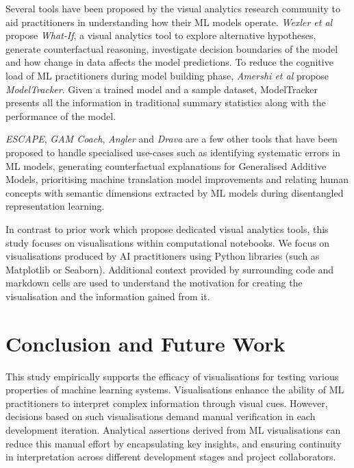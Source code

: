 Several tools have been proposed by the visual analytics research community to aid practitioners in understanding how their ML models operate. \emph{Wexler et al} propose \textit{What-If}, a visual analytics tool to explore alternative hypotheses, generate counterfactual reasoning, investigate decision boundaries of the model and how change in data affects the model predictions. To reduce the cognitive load of ML practitioners during model building phase, \emph{Amershi et al} propose \textit{ModelTracker}. Given a trained model and a sample dataset, ModelTracker presents all the information in traditional summary statistics along with the performance of the model.

\textit{ESCAPE}, \textit{GAM Coach}, \textit{Angler} and \textit{Drava} are a few other tools that have been proposed to handle specialised use-cases such as identifying systematic errors in ML models, generating counterfactual explanations for Generalised Additive Models, prioritising machine translation model improvements and relating human concepts with semantic dimensions extracted by ML models during disentangled representation learning\cite{ahn2023escape, wang2023gam, robertson2023angler, wang2023drava}.

In contrast to prior work which propose dedicated visual analytics tools, this study focuses on visualisations within computational notebooks. We focus on visualisations produced by AI practitioners using Python libraries (such as Matplotlib or Seaborn). Additional context provided by surrounding code and markdown cells are used to understand the motivation for creating the visualisation and the information gained from it.

\section{Conclusion and Future Work}


This study empirically supports the efficacy of visualisations for testing various properties of machine learning systems. Visualisations enhance the ability of ML practitioners to interpret complex information through visual cues. However, decisions based on such visualisations demand manual verification in each development iteration. Analytical assertions derived from ML visualisations can reduce this manual effort by encapsulating key insights, and ensuring continuity in interpretation across different development stages and project collaborators.

